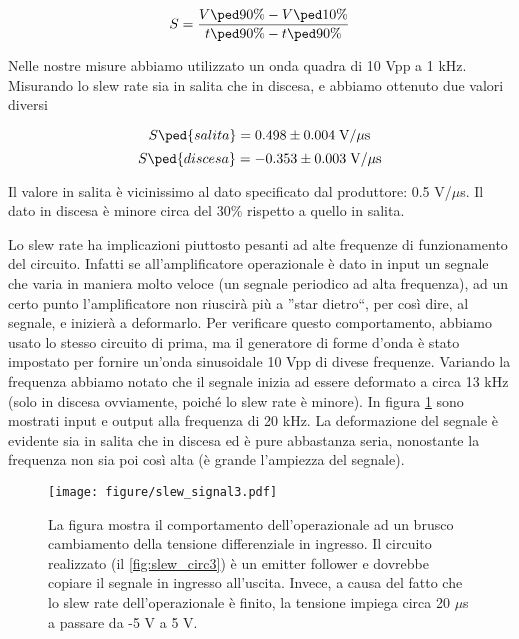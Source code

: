 \begin{equation}
    S = \frac{V\ped{90\%} - V\ped{10\%}}{t\ped{90\%} - t\ped{90\%}}
\end{equation}

Nelle nostre misure abbiamo utilizzato un onda quadra di 10 Vpp a 1 kHz.
Misurando lo slew rate sia in salita che in discesa, e abbiamo ottenuto
due valori diversi

\begin{equation}
    S\ped{salita} = 0.498 \pm 0.004 \; \text{V/$\mu$s}
\end{equation}
\begin{equation}
    S\ped{discesa} = -0.353 \pm 0.003 \; \text{V/$\mu$s}
\end{equation}

Il valore in salita è vicinissimo al dato specificato dal produttore: 0.5 V/$\mu$s.
Il dato in discesa è minore circa del 30\% rispetto a quello in salita.

Lo slew rate ha implicazioni piuttosto pesanti ad alte frequenze di funzionamento del circuito.
Infatti se all'amplificatore operazionale è dato in input un segnale che varia in maniera molto
veloce (un segnale periodico ad alta frequenza), ad un certo punto l'amplificatore non riuscirà
più a ''star dietro``, per così dire, al segnale, e inizierà a deformarlo. Per verificare questo
comportamento, abbiamo usato lo stesso circuito di prima, ma il generatore di forme d'onda è
stato impostato per fornire un'onda sinusoidale 10 Vpp di divese frequenze. Variando la frequenza
abbiamo notato che il segnale inizia ad essere deformato a circa 13 kHz (solo in discesa ovviamente,
poiché lo slew rate è minore). In figura \ref{fig:slew_signal3} sono mostrati input e output
alla frequenza di 20 kHz. La deformazione del segnale è evidente sia in salita che in discesa ed è
pure abbastanza seria, nonostante la frequenza non sia poi così alta (è grande l'ampiezza del segnale).

\begin{figure}
    \texttt{[image: figure/slew\_signal3.pdf]}
    \caption{La figura mostra il comportamento dell'operazionale ad un brusco cambiamento della tensione
        differenziale in ingresso. Il circuito realizzato (il \ref{fig:slew_circ3}) è un emitter follower
        e dovrebbe copiare il segnale in ingresso all'uscita. Invece, a causa del fatto che lo slew rate
        dell'operazionale è finito, la tensione impiega circa 20 $\mu$s a passare da -5 V a 5 V.}
    \label{fig:slew_signal3}
\end{figure}

